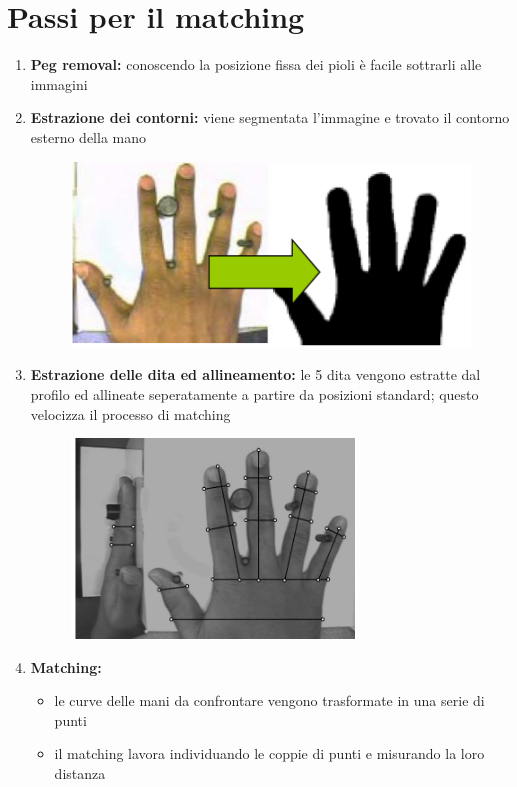 \documentclass{report}
\begin{document}
\section{Passi per il matching}
\begin{enumerate}
    \item \textbf{Peg removal:} conoscendo la posizione fissa dei 
    pioli è facile sottrarli alle immagini 
    \item \textbf{Estrazione dei contorni:} viene segmentata l'immagine 
    e trovato il contorno esterno della mano

    \begin{figure}[ht]
        \centering
        \includegraphics[width=0.6\linewidth]{images/contorni.png}
    \end{figure}
    \item \textbf{Estrazione delle dita ed allineamento:} le 5 dita 
    vengono estratte dal profilo ed allineate seperatamente a partire da posizioni 
    standard; questo velocizza il processo di matching

    \begin{figure}[ht]
        \centering
        \includegraphics[width=0.5\linewidth]{images/allineamento.png}
    \end{figure}
    \item \textbf{Matching:}
    \begin{itemize}
        \item le curve delle mani da confrontare vengono trasformate in una 
        serie di punti 
        \item il matching lavora individuando le coppie di punti e misurando 
        la loro distanza


\end{itemize}
\end{enumerate}
\end{document}
